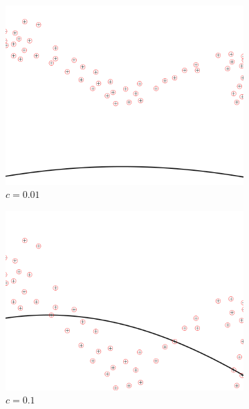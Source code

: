 \documentclass[a4paper, 11pt, one column]{article}
\begin{document}
\begin{figure}[]
        \begin{subfigure}{0.33\linewidth}
            \includegraphics[width=\linewidth]{images/rbf_2_c_0.01.png}
            \caption{$c=0.01$}
        \end{subfigure}\hfil
        \begin{subfigure}{0.33\linewidth}
            \includegraphics[width=\linewidth]{images/rbf_2_c_0.1.png}
            \caption{$c=0.1$}
        \end{subfigure}\hfil
        \begin{subfigure}{0.33\linewidth}

\end{subfigure}
\end{figure}
\end{document}
